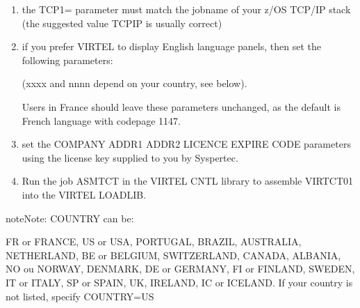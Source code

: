 \documentclass[letterpaper,10pt,english]{sphinxmanual}
\begin{document}
\begin{enumerate}
\begin{enumerate}
\item {} 
the TCP1= parameter must match the jobname of your z/OS
TCP/IP stack (the suggested value TCPIP is usually correct)

\item {} 
if you prefer VIRTEL to display English language panels, then set
the following parameters:

\begin{sphinxVerbatim}[commandchars=\\\{\}]
                                               
                                           
                                        
\end{sphinxVerbatim}

(xxxx and nnnn depend on your country, see below).

Users in France should leave these parameters unchanged, as the
default is French language with codepage 1147.

\item {} 
set the COMPANY ADDR1 ADDR2 LICENCE EXPIRE CODE parameters using
the license key supplied to you by Syspertec.

\item {} 
Run the job ASMTCT in the VIRTEL CNTL library to assemble VIRTCT01
into the VIRTEL LOADLIB.

\end{enumerate}

\end{enumerate}

\begin{sphinxadmonition}{note}{Note:}
COUNTRY can be:

FR or FRANCE, US or USA, PORTUGAL, BRAZIL, AUSTRALIA,
NETHERLAND, BE or BELGIUM, SWITZERLAND, CANADA, ALBANIA,
NO ou NORWAY, DENMARK, DE or GERMANY, FI or FINLAND,
SWEDEN, IT or ITALY, SP or SPAIN, UK, IRELAND, IC or ICELAND.
If your country is not listed, specify COUNTRY=US
\end{sphinxadmonition}
\end{document}
